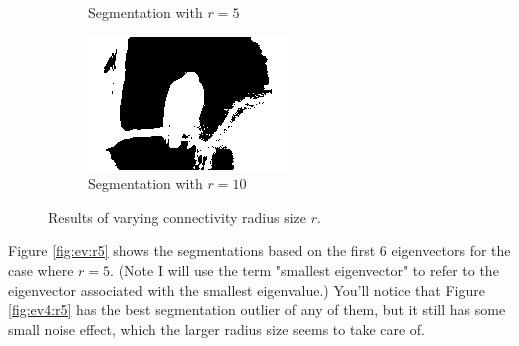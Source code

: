 \documentclass[11pt]{article}
\begin{document}
\begin{figure}
\begin{subfigure}[b]{0.4\textwidth}
\caption{Segmentation with $r=5$}
\label{rad:r5}
\end{subfigure}
\begin{subfigure}[b]{0.4\textwidth}
\centering
\includegraphics[width=\textwidth]{hawk_10_seg}
\caption{Segmentation with $r=10$}
\label{rad:r10}
\end{subfigure}
\caption{Results of varying connectivity radius size $r$.}
\label{fig:radius}
\end{figure}


Figure \ref{fig:ev:r5} shows the segmentations based on the first 6 eigenvectors for the case where $r=5$.
(Note I will use the term "smallest eigenvector" to refer to the eigenvector associated with the smallest eigenvalue.)
You'll notice that Figure \ref{fig:ev4:r5} has the best segmentation outlier of any of them, but it still has some small noise effect, which the larger radius size seems to take care of.
\end{document}
